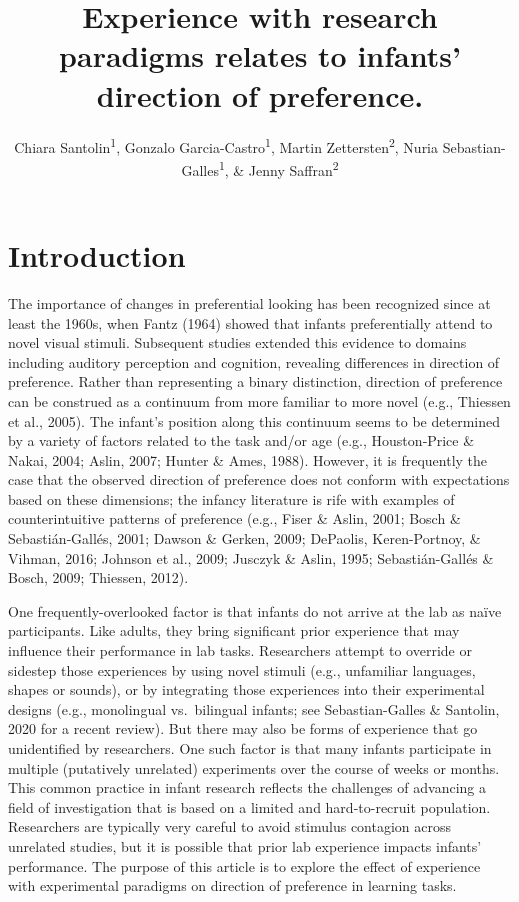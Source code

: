 \documentclass[english,man,man,floatsintext]{apa6}
\author{Chiara Santolin\textsuperscript{1}, Gonzalo Garcia-Castro\textsuperscript{1}, Martin Zettersten\textsuperscript{2}, Nuria Sebastian-Galles\textsuperscript{1}, \& Jenny Saffran\textsuperscript{2}}
\affiliation{
\vspace{0.5cm}
\textsuperscript{1} Center for Brain and Cognition, Universitat Pompeu Fabra\\\textsuperscript{2} Waisman Center \& Department of Psychology, University of Wisconsin-Madison}
\title{Experience with research paradigms relates to infants' direction of preference.}
\date{}
\begin{document}
\maketitle

\hypertarget{introduction}{%
\section{Introduction}\label{introduction}}

The importance of changes in preferential looking has been recognized since at least the 1960s, when Fantz (1964) showed that infants preferentially attend to novel visual stimuli. Subsequent studies extended this evidence to domains including auditory perception and cognition, revealing differences in direction of preference. Rather than representing a binary distinction, direction of preference can be construed as a continuum from more familiar to more novel (e.g., Thiessen et al., 2005). The infant's position along this continuum seems to be determined by a variety of factors related to the task and/or age (e.g., Houston‐Price \& Nakai, 2004; Aslin, 2007; Hunter \& Ames, 1988). However, it is frequently the case that the observed direction of preference does not conform with expectations based on these dimensions; the infancy literature is rife with examples of counterintuitive patterns of preference (e.g., Fiser \& Aslin, 2001; Bosch \& Sebastián‐Gallés, 2001; Dawson \& Gerken, 2009; DePaolis, Keren-Portnoy, \& Vihman, 2016; Johnson et al., 2009; Jusczyk \& Aslin, 1995; Sebastián-Gallés \& Bosch, 2009; Thiessen, 2012).

One frequently-overlooked factor is that infants do not arrive at the lab as naïve participants. Like adults, they bring significant prior experience that may influence their performance in lab tasks. Researchers attempt to override or sidestep those experiences by using novel stimuli (e.g., unfamiliar languages, shapes or sounds), or by integrating those experiences into their experimental designs (e.g., monolingual vs.~bilingual infants; see Sebastian-Galles \& Santolin, 2020 for a recent review). But there may also be forms of experience that go unidentified by researchers. One such factor is that many infants participate in multiple (putatively unrelated) experiments over the course of weeks or months. This common practice in infant research reflects the challenges of advancing a field of investigation that is based on a limited and hard-to-recruit population. Researchers are typically very careful to avoid stimulus contagion across unrelated studies, but it is possible that prior lab experience impacts infants' performance. The purpose of this article is to explore the effect of experience with experimental paradigms on direction of preference in learning tasks.
\end{document}
